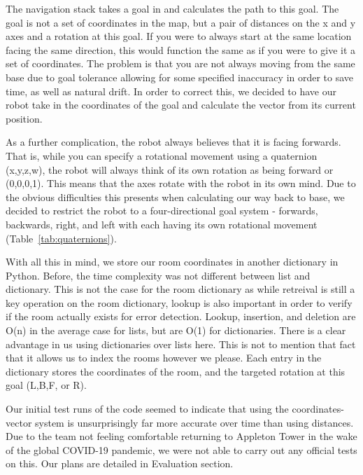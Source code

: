 \documentclass{article}
\begin{document}
The navigation stack takes a goal in and calculates the path to this goal. The goal is not a set of coordinates in the map, but a pair of distances on the x and y axes and a rotation at this goal. If you were to always start at the same location facing the same direction, this would function the same as if you were to give it a set of coordinates. The problem is that you are not always moving from the same base due to goal tolerance allowing for some specified inaccuracy in order to save time, as well as natural drift. In order to correct this, we decided to have our robot take in the coordinates of the goal and calculate the vector from its current position.

As a further complication, the robot always believes that it is facing forwards. That is, while you can specify a rotational movement using a quaternion (x,y,z,w), the robot will always think of its own rotation as being forward or (0,0,0,1). This means that the axes rotate with the robot in its own mind. Due to the obvious difficulties this presents when calculating our way back to base, we decided to restrict the robot to a four-directional goal system - forwards, backwards, right, and left with each having its own rotational movement (Table~\ref{tab:quaternions}).

With all this in mind, we store our room coordinates in another dictionary in Python. Before, the time complexity was not different between list and dictionary. This is not the case for the room dictionary as while retreival is still a key operation on the room dictionary, lookup is also important in order to verify if the room actually exists for error detection. Lookup, insertion, and deletion are O(n) in the average case for lists, but are O(1) for dictionaries. There is a clear advantage in us using dictionaries over lists here. This is not to mention that fact that it allows us to index the rooms however we please. Each entry in the dictionary stores the coordinates of the room, and the targeted rotation at this goal (L,B,F, or R).

Our initial test runs of the code seemed to indicate that using the coordinates-vector system is unsurprisingly far more accurate over time than using distances. Due to the team not feeling comfortable returning to Appleton Tower in the wake of the global COVID-19 pandemic, we were not able to carry out any official tests on this. Our plans are detailed in Evaluation section.
\end{document}
